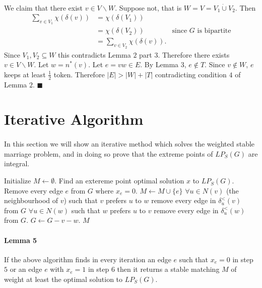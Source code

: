 \documentclass[letterpaper,12pt,oneside,onecolumn]{article}
\begin{document}
\paragraph{}
We claim that there exist $v \in V\backslash W$. Suppose not, that is $W = V = V_1 \dot\cup V_2$. Then
\begin{align*}
\sum_{v \in V_1} \chi(\delta(v)) &= \chi(\delta(V_1)) \\
&= \chi(\delta(V_2)) &\text{since $G$ is bipartite} \\
&= \sum_{v \in V_2} \chi(\delta(v)).
\end{align*}
Since $V_1, V_2 \subseteq W$ this contradicts Lemma $2$ part $3$. Therefore there exists $v \in V \backslash W$. Let $w = n^*(v)$. Let $e = vw \in E$. By Lemma $3$, $e \not \in T$. Since $v \not\in W$, $e$ keeps at least $\frac{1}{2}$ token. Therefore $|E| > |W| + |T|$ contradicting condition $4$ of Lemma $2$. $\blacksquare$
\section{Iterative Algorithm}
\paragraph{}
In this section we will show an iterative method which solves the weighted stable marriage problem, and in doing so prove that the extreme points of $LP_S(G)$ are integral. 

\begin{algorithm} \begin{algorithmic}[1]
\State Initialize $M \gets \emptyset$.
\State Find an extereme point optimal solution $x$ to $LP_S(G)$.
\State Remove every edge $e$ from $G$ where $x_e = 0$.
\State $M \gets M \cup \{e\}$
\State $\forall u \in N(v)$ (the neighbourhood of $v$) such that $v$ prefers $u$ to $w$ remove every edge in $\delta_u^<(v)$ from $G$
\State $\forall u \in N(w)$ such that $w$ prefers $u$ to $v$ remove every edge in $\delta_u^<(w)$ from $G$.
\State $G \gets G - v - w$.
\EndIf
\EndWhile
\State \Return $M$
\EndProcedure
\end{algorithmic} \end{algorithm}

\paragraph{Lemma 5}
If the above algorithm finds in every iteration an edge $e$ such that $x_e = 0$ in step $5$ or an edge $e$ with $x_e = 1$ in step $6$ then it returns a stable matching $M$ of weight at least the optimal solution to $LP_S(G)$.
\end{document}
